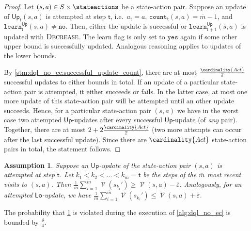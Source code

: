 \documentclass{article}
\newcommand{\States}{S}
\newcommand{\Actions}{Act}
\DeclareMathOperator{\val}{\mathcal{V}}
\newcommand{\upperbound}{\mathsf{Up}}
\newcommand{\lowerbound}{\mathsf{Lo}}
\newcommand{\updatestep}{{\overline{\varepsilon}}}
\newcommand{\delay}{{\overline{m}}}
\newcommand{\visitcount}{\texttt{count}}
\newcommand{\learn}{\texttt{learn}}
\newcommand{\learnyes}{\texttt{yes}}
\newcommand{\learnno}{\texttt{no}}
\newcommand{\learndecrease}{\textsc{Decrease}}
\newcommand{\algostep}{\mathsf{t}}
\newtheorem{assumption}{Assumption}
\begin{document}
\begin{proof}
	Let $(s, a) \in \States \times \stateactions$ be a state-action pair.
	Suppose an update of $\upperbound_\algostep(s, a)$ is attempted at step $\algostep$, i.e.\ $a_\algostep = a$, $\visitcount_\algostep(s, a) = \delay - 1$, and $\learn_\algostep^\upperbound(s, a) \neq \learnno$.
	Then, either the update is successful or $\learn^\upperbound_{\algostep + 1}(s, a)$ is updated with $\learndecrease$.
	The learn flag is only set to $\learnyes$ again if some other upper bound is successfully updated.
	Analogous reasoning applies to updates of the lower bounds.

	By \cref{stm:dql_no_ec:successful_update_count}, there are at most $\frac{\cardinality{\Actions}}{\updatestep}$ successful updates to either bounds in total.
	If an update of a particular state-action pair is attempted, it either succeeds or fails.
	In the latter case, at most one more update of this state-action pair will be attempted until an other update succeeds.
	Hence, for a particular state-action pair $(s, a)$ we have in the worst case two attempted $\upperbound$-updates after every successful $\upperbound$-update (of \emph{any} pair).
	Together, there are at most $2 + 2 \frac{\cardinality{\Actions}}{\updatestep}$ (two more attempts can occur after the last successful update).
	Since there are $\cardinality{\Actions}$ state-action pairs in total, the statement follows. 
\end{proof}
\begin{assumption} \label{asm:dql_no_ec:sampled_value_close_to_real_value}
	Suppose an $\upperbound$-update of the state-action pair $(s, a)$ is attempted at step $\algostep$.
	Let $k_1 < k_2 < \ldots < k_\delay = \algostep$ be the steps of the $\delay$ most recent visits to $(s, a)$.
	Then $\frac{1}{\delay} \sum_{i=1}^\delay \val(s_{k_i}') \geq \val(s, a) - \updatestep$.
	Analogously, for an attempted $\lowerbound$-update, we have $\frac{1}{\delay} \sum_{i=1}^\delay \val(s_{k_i}') \leq \val(s, a) + \updatestep$. 
\end{assumption}

\begin{lemma} \label{stm:dql_no_ec:sampled_value_close_to_real_value_probability}
	The probability that \cref{asm:dql_no_ec:sampled_value_close_to_real_value} is violated during the execution of \cref{alg:dql_no_ec} is bounded by $\frac{\delta}{4}$. 
\end{lemma}
\end{document}
